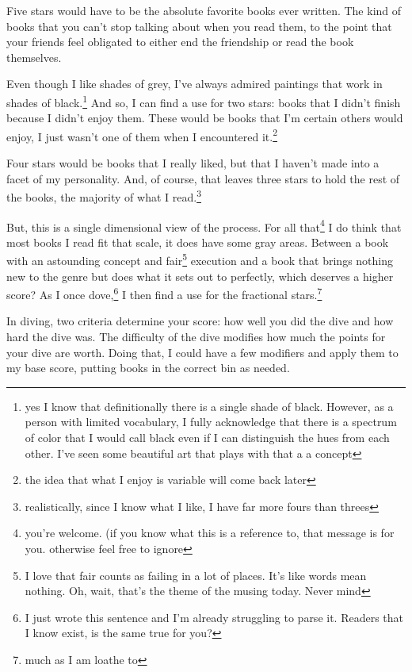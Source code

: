 \documentclass[12pt]{article}[titlepage]
\newcommand{\1}{\={a}}
\newcommand{\2}{\={e}}
\newcommand{\3}{\={\i}}
\newcommand{\4}{\=o}
\newcommand{\5}{\=u}
\newcommand{\6}{\={A}}
\renewcommand{\,}{\textsuperscript{,}}
\begin{document}
Five stars would have to be the absolute favorite books ever written.
The kind of books that you can't stop talking about when you read them, to the point that your friends feel obligated to either end the friendship or read the book themselves.

Even though I like shades of grey, I've always admired paintings that work in shades of black.\footnote{yes I know that definitionally there is a single shade of black. However, as a person with limited vocabulary, I fully acknowledge that there is a spectrum of color that I would call black even if I can distinguish the hues from each other.
I've seen some beautiful art that plays with that a a concept}
And so, I can find a use for two stars: books that I didn't finish because I didn't enjoy them.
These would be books that I'm certain others would enjoy, I just wasn't one of them when I encountered it.\footnote{the idea that what I enjoy is variable will come back later}

Four stars would be books that I really liked, but that I haven't made into a facet of my personality.
And, of course, that leaves three stars to hold the rest of the books, the majority of what I read.\footnote{realistically, since I know what I like, I have far more fours than threes}

But, this is a single dimensional view of the process.
For all that\footnote{you're welcome. (if you know what this is a reference to, that message is for you. otherwise feel free to ignore} I do think that most books I read fit that scale, it does have some gray areas.
Between a book with an astounding concept and fair\footnote{I love that fair counts as failing in a lot of places. It's like words mean nothing. Oh, wait, that's the theme of the musing today. Never mind} execution and a book that brings nothing new to the genre but does what it sets out to perfectly, which deserves a higher score?
As I once dove,\footnote{I just wrote this sentence and I'm already struggling to parse it. Readers that I know exist, is the same true for you?} I then find a use for the fractional stars.\footnote{much as I am loathe to}

In diving, two criteria determine your score: how well you did the dive and how hard the dive was.
The difficulty of the dive modifies how much the points for your dive are worth.
Doing that, I could have a few modifiers and apply them to my base score, putting books in the correct bin as needed.
\end{document}
